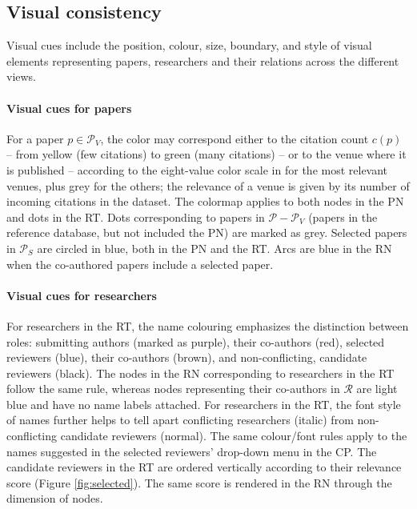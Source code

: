 \subsection{Visual consistency}
\label{subsec:visualvar}

Visual cues include the position, colour, size, boundary, and style of visual elements representing papers, researchers and their relations across the different views.  

\paragraph*{Visual cues for papers} 
For a paper $p \in \mathcal{P}_{V}$, the color may correspond either to the citation count $c(p)$ -- from yellow (few citations) to green (many citations) -- or to the venue where it is published -- according to the eight-value color scale in \cite{Wa13} for the most relevant venues, plus grey for the others; the relevance of a venue is given by its number of incoming citations in the dataset. The colormap applies to both nodes in the PN and dots in the RT. Dots corresponding to papers in $\mathcal{P} - \mathcal{P}_V$ (papers in the reference database, but not included the PN) are marked as grey. 
Selected papers in $\mathcal{P}_S$ are circled in blue, both in the PN and the RT.  Arcs are blue in the RN when the co-authored papers include a selected paper.  

\paragraph*{Visual cues for researchers} 
For researchers in the RT, the name colouring emphasizes the distinction between roles: submitting authors (marked as purple), their co-authors (red), selected reviewers (blue), their co-authors (brown), and non-conflicting, candidate reviewers (black). The nodes in the RN corresponding to researchers in the RT follow the same rule, whereas nodes representing their co-authors in $\mathcal{R}$ are light blue and have no name labels attached.   
For researchers in the RT, the font style of names further helps to tell apart conflicting researchers (italic) from non-conflicting candidate reviewers (normal). The same colour/font rules apply to the names suggested in the selected reviewers' drop-down menu in the CP.
The candidate reviewers in the RT are ordered vertically according to their relevance score (Figure \ref{fig:selected}). The same score is rendered in the RN through the dimension of nodes.  

